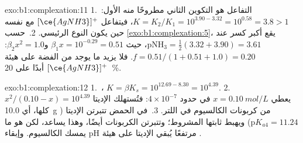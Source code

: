 \begin{solution}{exo:b1:complexation:11}
1.~التفاعل هو التكوين الثاني مطروحًا منه الأول: $K = K_2/K_1 =
10^{3.90 - 3.32} = 10^{0.58} = 3.8 > 1$، فيتفاعل $[\ce{AgNH3}]^{+}$ مع
نفسه حين يكون النوع الرئيسي.
2.~حسب \cref{exo:b1:complexation:5}، يقع أكبر كسر عند
$\mathrm{pNH_3} = \frac12(3.32 + 3.90) = 3.61$، حيث $\beta_1 x = 10^{-0.29}
= 0.51$ و$\beta_2x^2 = 1.0$: $f = 0.51/(1 + 0.51 + 1.0) = 0.20$. فلا يزيد
ما يوجد من الفضة على هيئة $[\ce{AgNH3}]^{+}$ أبدًا على \qty{20}{\percent}.
\end{solution}

\begin{solution}{exo:b1:complexation:12}
1.~، $K = \beta K_s = 10^{12.69 -
8.30} = 10^{4.39}$.
2.~$x^2/(0.10 - x) = 10^{4.39}$ يعطي $x = \qty{0.10}{mol/L}$ في حدود
$4 \times 10^{-7}$: فتُستهلك الإديتا كلها، أي \qty{10.0}{g} من كربونات
الكالسيوم في اللتر.
3.~في الحمض تتبرتن الإديتا ($\mathrm{p}K_{a4} = 11.24$) ويهبط
ثابتها المشروط؛ وتتبرتن الكربونات أيضًا، وهذا يساعد،
لكن  هو ما يمسك الكالسيوم. وإبقاء pH مرتفعًا يُبقي
الإديتا على هيئة .
\end{solution}

